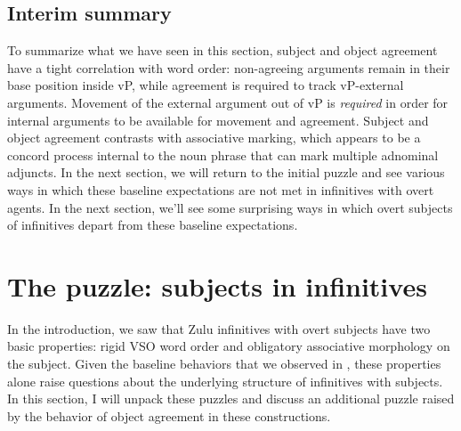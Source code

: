 \documentclass[output=paper,colorlinks,citecolor=brown]{langscibook}
\begin{document}



%         



\subsection{Interim summary}\label{sec:halpert:2.4}

To summarize what we have seen in this section, subject and object agreement have a tight correlation with word order: non-agreeing arguments remain in their base position inside vP, while agreement is required to track vP-external arguments. Movement of the external argument out of vP is \textit{required} in order for internal arguments to be available for movement and agreement. Subject and object agreement contrasts with associative marking, which appears to be a concord process internal to the noun phrase that can mark multiple adnominal adjuncts. In the next section, we will return to the initial puzzle and see various ways in which these baseline expectations are not met in infinitives with overt agents. In the next section, we'll see some surprising ways in which overt subjects of infinitives depart from these baseline expectations.

\section{The puzzle: subjects in infinitives}\label{sec:halpert:3}

In the introduction, we saw that Zulu infinitives with overt subjects have two basic properties: rigid VSO word order and obligatory associative morphology on the subject.  Given the baseline behaviors that we observed in , these properties alone raise questions about the underlying structure of infinitives with subjects.  In this section, I will unpack these puzzles and discuss an additional puzzle raised by the behavior of object agreement in these constructions.
\end{document}
